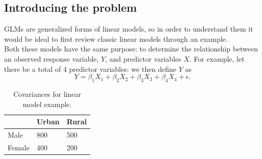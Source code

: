 \documentclass{article}
\begin{document}
\subsection{Introducing the problem}
GLMs are generalized forms of linear models, so in order to understand them it would be ideal to first review classic linear models through an example. \\
Both these models have the same purpose: to determine the relationship between an observed response variable, $Y$, and predictor variables $X$. For example, let there be a total of $4$ predictor variables: we then define $Y$ as
\begin{equation}
    Y = \beta_1X_1 + \beta_2X_2 + \beta_3X_3 + \beta_4X_4 + \epsilon.
\end{equation}

\begin{table}[H]
\centering
\begin{tabular}{l|l|l|}
\cline{2-3}
                             & Urban & Rural \\ \hline
\multicolumn{1}{|l|}{Male}   & 800   & 500   \\ \hline
\multicolumn{1}{|l|}{Female} & 400   & 200   \\ \hline
\end{tabular}
    \caption{Covariances for linear model example.}
    \label{fig:covariances_example}
\end{table}
\end{document}
